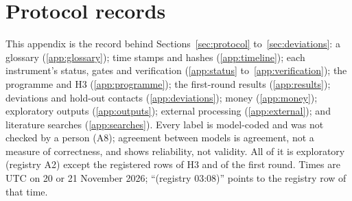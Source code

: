 
\section{Protocol records}
\label{app:protocol}

This appendix is the record behind Sections~\ref{sec:protocol} to~\ref{sec:deviations}: a glossary
(\ref{app:glossary}); time stamps and hashes (\ref{app:timeline}); each instrument's status, gates and verification
(\ref{app:status} to~\ref{app:verification}); the programme and H3 (\ref{app:programme}); the first-round results
(\ref{app:results}); deviations and hold-out contacts (\ref{app:deviations}); money (\ref{app:money}); exploratory
outputs (\ref{app:outputs}); external processing (\ref{app:external}); and literature searches (\ref{app:searches}).
Every label is model-coded and was not checked by a person (A8); agreement between models is agreement, not a measure of correctness,
and shows reliability, not validity. All of it is exploratory (registry A2) except the registered rows of H3 and of the
first round. Times are UTC on 20 or 21 November 2026; ``(registry 03:08)'' points to the registry row of that time.

